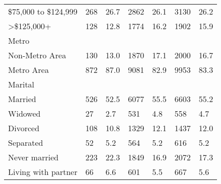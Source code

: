 \begin{longtable}{lllllll}
\$75,000 to \$124,999 & 268 & 26.7 & 2862 & 26.1 & 3130 & 26.2 \\ 
>\$125,000+ & 128 & 12.8 & 1774 & 16.2 & 1902 & 15.9 \\ 
\midrule
\multicolumn{1}{l}{Metro} \\ 
\midrule
Non-Metro Area & 130 & 13.0 & 1870 & 17.1 & 2000 & 16.7 \\ 
Metro Area & 872 & 87.0 & 9081 & 82.9 & 9953 & 83.3 \\ 
\midrule
\multicolumn{1}{l}{Marital} \\ 
\midrule
Married & 526 & 52.5 & 6077 & 55.5 & 6603 & 55.2 \\ 
Widowed & 27 & 2.7 & 531 & 4.8 & 558 & 4.7 \\ 
Divorced & 108 & 10.8 & 1329 & 12.1 & 1437 & 12.0 \\ 
Separated & 52 & 5.2 & 564 & 5.2 & 616 & 5.2 \\ 
Never married & 223 & 22.3 & 1849 & 16.9 & 2072 & 17.3 \\ 
Living with partner & 66 & 6.6 & 601 & 5.5 & 667 & 5.6 \\ 
\bottomrule
\end{longtable}

